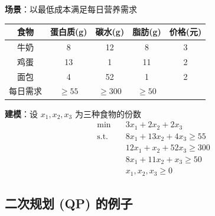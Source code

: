 \documentclass[12pt, a4paper]{ctexart}
\begin{document}
\begin{blackboard}[LP 例子 3：饮食问题]

\textbf{场景}：以最低成本满足每日营养需求

\begin{center}
\begin{tabular}{c|ccc|c}
食物 & 蛋白质(g) & 碳水(g) & 脂肪(g) & 价格(元) \\
\hline
牛奶 & 8 & 12 & 8 & 3 \\
鸡蛋 & 13 & 1 & 11 & 2 \\
面包 & 4 & 52 & 1 & 2 \\
\hline
每日需求 & $\geq 55$ & $\geq 300$ & $\geq 50$ &
\end{tabular}
\end{center}

\textbf{建模}：设 $x_1, x_2, x_3$ 为三种食物的份数
\[
\begin{aligned}
\min \quad & 3x_1 + 2x_2 + 2x_3 \\
\text{s.t.} \quad & 8x_1 + 13x_2 + 4x_3 \geq 55 \\
& 12x_1 + x_2 + 52x_3 \geq 300 \\
& 8x_1 + 11x_2 + x_3 \geq 50 \\
& x_1, x_2, x_3 \geq 0
\end{aligned}
\]

\end{blackboard}

\subsection{二次规划 (QP) 的例子}
\end{document}
